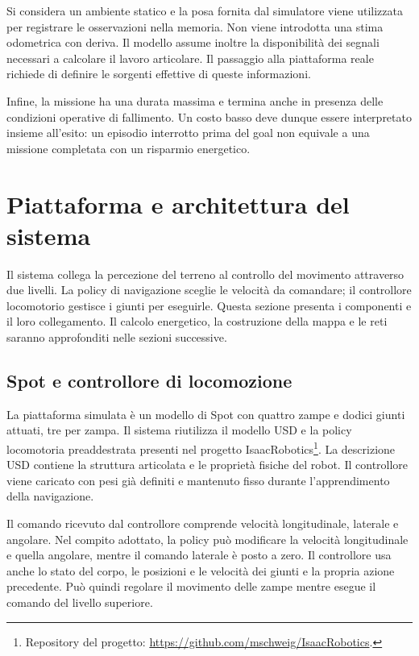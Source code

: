 Si considera un ambiente statico e la posa fornita dal simulatore viene utilizzata per registrare le osservazioni nella memoria. Non viene introdotta una stima odometrica con deriva. Il modello assume inoltre la disponibilità dei segnali necessari a calcolare il lavoro articolare. Il passaggio alla piattaforma reale richiede di definire le sorgenti effettive di queste informazioni.

Infine, la missione ha una durata massima e termina anche in presenza delle condizioni operative di fallimento. Un costo basso deve dunque essere interpretato insieme all'esito: un episodio interrotto prima del goal non equivale a una missione completata con un risparmio energetico.

\section{Piattaforma e architettura del sistema}
\label{sec:metodo-piattaforma}
\label{sec:metodo-architettura}

Il sistema collega la percezione del terreno al controllo del movimento attraverso due livelli. La policy di navigazione sceglie le velocità da comandare; il controllore locomotorio gestisce i giunti per eseguirle. Questa sezione presenta i componenti e il loro collegamento. Il calcolo energetico, la costruzione della mappa e le reti saranno approfonditi nelle sezioni successive.

\subsection{Spot e controllore di locomozione}

La piattaforma simulata è un modello di Spot con quattro zampe e dodici giunti attuati, tre per zampa. Il sistema riutilizza il modello USD e la policy locomotoria preaddestrata presenti nel progetto IsaacRobotics\footnote{Repository del progetto: \url{https://github.com/mschweig/IsaacRobotics}.}. La descrizione USD contiene la struttura articolata e le proprietà fisiche del robot. Il controllore viene caricato con pesi già definiti e mantenuto fisso durante l'apprendimento della navigazione.

Il comando ricevuto dal controllore comprende velocità longitudinale, laterale e angolare. Nel compito adottato, la policy può modificare la velocità longitudinale e quella angolare, mentre il comando laterale è posto a zero. Il controllore usa anche lo stato del corpo, le posizioni e le velocità dei giunti e la propria azione precedente. Può quindi regolare il movimento delle zampe mentre esegue il comando del livello superiore.


